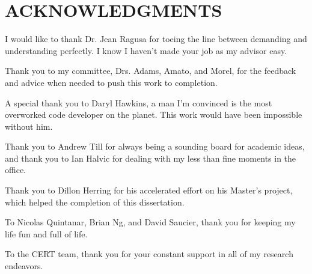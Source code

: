 %
%
%
%


\chapter*{ACKNOWLEDGMENTS}


\indent I would like to thank Dr. Jean Ragusa for toeing the line between demanding and understanding perfectly. I know I haven't made your job as my advisor easy. 

Thank you to my committee, Drs. Adams, Amato, and Morel, for the feedback and advice when needed to push this work to completion.

A special thank you to Daryl Hawkins, a man I'm convinced is the most overworked code developer on the planet. This work would have been impossible without him. 

Thank you to Andrew Till for always being a sounding board for academic ideas, and thank you to Ian Halvic for dealing with my less than fine moments in the office. 

Thank you to Dillon Herring for his accelerated effort on his Master's project, which helped the completion of this dissertation.

To Nicolas Quintanar, Brian Ng, and David Saucier, thank you for keeping my life fun and full of life. 

To the CERT team, thank you for your constant support in all of my research endeavors.




\pagebreak{}